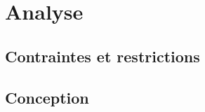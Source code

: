 \part{Analyse}

\clearemptydoublepage
\chapter{Contraintes et restrictions}
\label{chapter:les_contraintes}
\minitoc




\clearemptydoublepage
\chapter{Conception}
\minitoc



